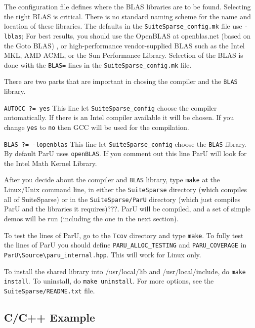 \documentclass[12pt]{article}
\begin{document}
The configuration file defines where the BLAS libraries are to be
found.  Selecting the right BLAS is critical.  There is no standard naming
scheme for the name and location of these libraries.  The defaults in the
\verb'SuiteSparse_config.mk' file use \verb'-lblas';
For best results, you should use the OpenBLAS at openblas.net (based on the 
Goto BLAS) \cite{GotoVanDeGeijn08}, or high-performance vendor-supplied BLAS 
such as the Intel MKL, AMD ACML, or the Sun Performance Library.  Selection of 
the BLAS is done with the \verb'BLAS=' lines in the
\verb'SuiteSparse_config.mk' file.

There are two parts that are important in chosing the compiler and the
\verb'BLAS' library.


\verb 'AUTOCC ?= yes' This line let \verb'SuiteSparse_config' choose the 
compiler automatically. If there is an Intel compiler available it will be chosen. 
If you change \verb'yes' to \verb'no' then GCC will be used for the compilation.


\verb 'BLAS ?= -lopenblas' This line let \verb'SuiteSparse_config' choose the 
\verb'BLAS' library. By default ParU uses  \verb'openBLAS'. If you comment out
this line ParU will look for the Intel Math Kernel Library. 

After you decide about the compiler and \verb'BLAS' library, type \verb'make' at 
the Linux/Unix command line, in either the 
\verb'SuiteSparse' directory (which compiles all of SuiteSparse) or in the 
\verb'SuiteSparse/ParU' directory (which just compiles ParU and the 
libraries it requires)???.  ParU will be compiled, and a set of simple demos 
will be run (including the one in the next section).

To  test the lines of ParU, go to the \verb'Tcov'
directory and type \verb'make'.  To fully test the lines of ParU you 
should define \verb'PARU_ALLOC_TESTING' and \verb'PARU_COVERAGE' in
\verb'ParU\Source\paru_internal.hpp'.
This will work for Linux only.

To install the shared library
into /usr/local/lib and /usr/local/include, do {\tt make install}.
To uninstall, do {\tt make uninstall}.
For more options, see the {\tt SuiteSparse/README.txt} file.

\subsection{C/C++ Example}
\end{document}
